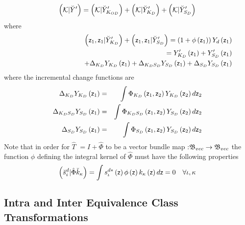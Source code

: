 \begin{equation}
\left( {\cal K}|\breve{Y}^{\prime }\right) =\left( {\cal K}|\breve{Y}%
_{K_{OD}}^{\prime }\right) +\left( {\cal K}|\breve{Y}_{K_{D}}^{\prime
}\right) +\left( {\cal K}|\breve{Y}_{S_{D}}^{\prime }\right)
\end{equation}%
where 
\begin{eqnarray}
&&\left( {\sf z}_{1},{\sf z}_{1}|\breve{Y}_{K_{D}}^{\prime }\right) +\left( 
{\sf z}_{1},{\sf z}_{1}|\breve{Y}_{S_{D}}^{\prime }\right) =\left( 1+\phi
\left( {\sf z}_{1}\right) \right) Y_{d}\left( {\sf z}_{1}\right)  \nonumber
\\
&&\qquad \qquad \qquad \qquad =Y_{K_{D}}^{\prime }\left( {\sf z}_{1}\right)
+Y_{S_{D}}^{\prime }\left( {\sf z}_{1}\right)  \nonumber \\
&&\qquad \qquad \qquad \qquad +\Delta _{K_{D}}Y_{K_{D}}\left( {\sf z}%
_{1}\right) +\Delta _{K_{D}S_{D}}Y_{S_{D}}\left( {\sf z}_{1}\right) +\Delta
_{S_{D}}Y_{S_{D}}\left( {\sf z}_{1}\right)  \label{diagker}
\end{eqnarray}%
where the incremental change functions are 
\begin{eqnarray}
\Delta _{K_{D}}Y_{K_{D}}\left( {\sf z}_{1}\right) &=&\int \Phi
_{K_{D}}\left( {\sf z}_{1},{\sf z}_{2}\right) Y_{K_{D}}\left( {\sf z}%
_{2}\right) d{\sf z}_{2}  \nonumber \\
\Delta _{K_{D}S_{D}}Y_{S_{D}}\left( {\sf z}_{1}\right) &=&\int \Phi
_{K_{D}S_{D}}\left( {\sf z}_{1},{\sf z}_{2}\right) Y_{S_{D}}\left( {\sf z}%
_{2}\right) d{\sf z}_{2}  \nonumber \\
\Delta _{S_{D}}Y_{S_{D}}\left( {\sf z}_{1}\right) &=&\int \Phi
_{S_{D}}\left( {\sf z}_{1},{\sf z}_{2}\right) Y_{S_{D}}\left( {\sf z}%
_{2}\right) d{\sf z}_{2}  \label{incrfun}
\end{eqnarray}%
Note that in order for $\hat{T}$ $=I+\hat{\Phi}$ to be a vector bundle map :$%
{\frak B}_{vec}\rightarrow {\frak B}_{vec}$ the function $\phi $ defining
the integral kernel of $\hat{\Phi}$ must have the following properties 
\begin{equation}
\left( \breve{s}_{i}^{d}|\hat{\Phi}\breve{k}_{\kappa }\right) =\int s_{\iota
}^{d\ast }\left( {\sf z}\right) \phi \left( {\sf z}\right) k_{\kappa }\left( 
{\sf z}\right) d{\sf z}=0\quad \forall \iota ,\kappa
\end{equation}

\subsection{Intra and Inter Equivalence Class Transformations}

